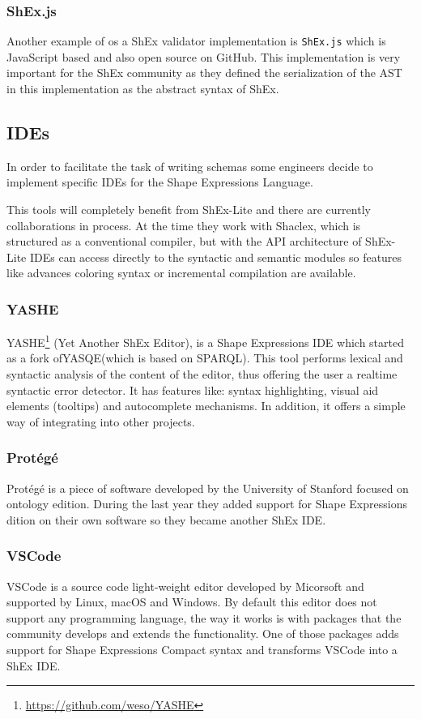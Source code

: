 \subsubsection{ShEx.js}
Another example of os a ShEx validator implementation is \texttt{ShEx.js} which is JavaScript based and also
open source on GitHub. This implementation is very important for the ShEx community as they defined the
serialization of the AST in this implementation as the abstract syntax of ShEx.


\subsection{IDEs}
In order to facilitate the task of writing schemas some engineers decide to implement specific IDEs for the
Shape Expressions Language.

This tools will completely benefit from ShEx-Lite and there are currently collaborations in process. At the
time they work with Shaclex, which is structured as a conventional compiler, but with the API architecture
of ShEx-Lite IDEs can access directly to the syntactic and semantic modules so features like advances coloring
syntax or incremental compilation are available.

\subsubsection{YASHE}
YASHE\footnote{\url{https://github.com/weso/YASHE}} (Yet Another ShEx Editor), is a Shape Expressions IDE
which started as a fork ofYASQE(which is based on SPARQL). This tool performs lexical and syntactic analysis
of the content of the editor, thus offering the user a realtime syntactic error detector. It has features
like: syntax highlighting, visual aid elements (tooltips) and autocomplete mechanisms. In addition, it offers
a simple way of integrating into other projects.

\subsubsection{Protégé}
Protégé is a piece of software developed by the University of Stanford focused on ontology edition. During the
last year they added support for Shape Expressions dition on their own software so they became another ShEx IDE.

\subsubsection{VSCode}
VSCode is a source code light-weight editor developed by Micorsoft and supported by Linux, macOS and Windows.
By default this editor does not support any programming language, the way it works is with packages that the
community develops and extends the functionality. One of those packages adds support for Shape Expressions
Compact syntax and transforms VSCode into a ShEx IDE.

